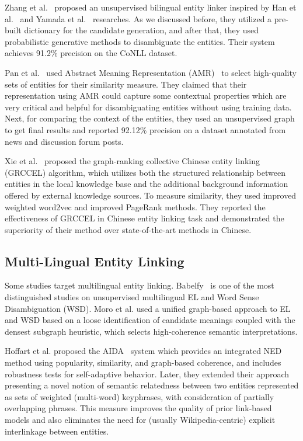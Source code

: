 \documentclass{article}
\begin{document}
Zhang et al.~\cite{zhang2017xlink} proposed an unsupervised bilingual entity linker inspired by Han et al.~\cite{han2011collective} and Yamada et al.~\cite{yamada2016joint} researches. As we discussed before, they utilized a pre-built dictionary for the candidate generation, and after that, they used probabilistic generative methods to disambiguate the entities. Their system achieves 91.2\%  precision on the CoNLL dataset.

Pan et al.~\cite{pan2015unsupervised} used Abstract Meaning Representation (AMR)~\cite{banarescu2013abstract} to select high-quality sets of entities for their similarity measure. They claimed that their representation using AMR could capture some contextual properties which are very critical and helpful for disambiguating entities without using training data. Next, for comparing the context of the entities, they used an unsupervised graph to get final results and reported 92.12\%  precision on a dataset annotated from news and discussion forum posts.

Xie et al.~\cite{xie2020graph} proposed the graph-ranking collective Chinese entity linking (GRCCEL) algorithm, which utilizes both the structured relationship between entities in the local knowledge base and the additional background information offered by external knowledge sources. To measure similarity, they used improved weighted word2vec and improved PageRank methods. They reported the effectiveness of GRCCEL in Chinese entity linking task and demonstrated the superiority of their method over state-of-the-art methods in Chinese.

\subsection{Multi-Lingual Entity Linking}
\label{sec:multilingual-entity-linking}
Some studies target multilingual entity linking. Babelfy~\cite{moro2014entity} is one of the most distinguished studies on unsupervised multilingual EL and Word Sense Disambiguation (WSD). Moro et al. used a unified graph-based approach to EL and WSD based on a loose identification of candidate meanings coupled with the densest subgraph heuristic, which selects high-coherence semantic interpretations.

Hoffart et al. proposed the AIDA~\cite{hoffart2011robust} system which provides an integrated NED method using popularity, similarity, and graph-based coherence, and includes robustness tests for self-adaptive behavior. Later, they extended their approach~\cite{hoffart2012kore} presenting a novel notion of semantic relatedness between two entities represented as sets of weighted (multi-word) keyphrases, with consideration of partially overlapping phrases. This measure improves the quality of prior link-based models and also eliminates the need for (usually Wikipedia-centric) explicit interlinkage between entities.
\end{document}
